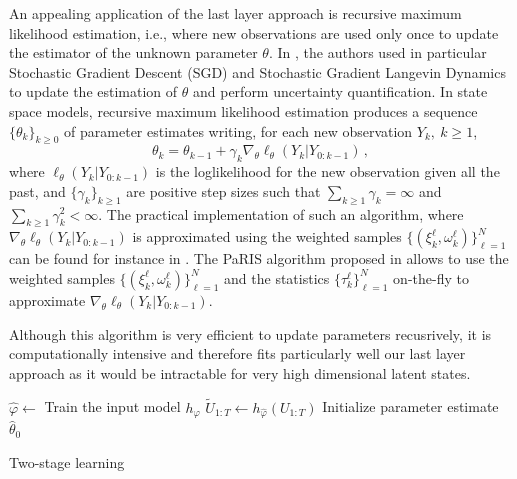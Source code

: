 \documentclass[conference]{IEEEtran}
\begin{document}
An appealing application of the last layer approach is recursive maximum likelihood estimation, i.e., where new observations are used only once to update the estimator of the unknown parameter $\theta$. In \cite{Brosse2020OnLA}, the authors used in particular Stochastic Gradient Descent (SGD) and Stochastic Gradient Langevin Dynamics to update the estimation of $\theta$ and perform uncertainty quantification. In state space models, recursive maximum likelihood estimation produces a sequence $\lbrace\theta_k\rbrace_{k\geq 0}$ of parameter estimates writing, for each new observation $Y_{k},~k\geq 1$,
$$
	\theta_{k} = \theta_{k-1} + \gamma_k \nabla_\theta \ell_{\theta}(Y_k | Y_{0:k - 1}) \,,
$$
where $\ell_{\theta}(Y_k | Y_{0:k - 1})$ is the loglikelihood for the new observation given all the past, and $\lbrace\gamma_k\rbrace_{k\geq 1}$ are positive step sizes such that $\sum_{k \geq 1}\gamma_k = \infty$ and $\sum_{k \geq 1}\gamma_k^2 < \infty$. The practical implementation of such an algorithm, where $\nabla_\theta\ell_{\theta}(Y_k | Y_{0:k - 1})$ is approximated using the weighted samples $\{(\xi^{\ell}_k,\omega^{\ell}_k)\}_{\ell=1}^N$ can be found for instance in \cite{gloaguen2022pseudo}. The PaRIS algorithm proposed in \cite{Olsson2014EfficientPO} allows to use the weighted samples $\{(\xi^{\ell}_k,\omega^{\ell}_k)\}_{\ell=1}^N$ and the statistics $\{\tau^{\ell}_k\}_{\ell=1}^N$ on-the-fly to approximate $\nabla_\theta \ell_{\theta}(Y_k | Y_{0:k - 1})$.

Although this algorithm is very efficient to update parameters recusrively, it is computationally intensive and therefore fits particularly well our last layer approach as it would be intractable for very high dimensional latent states.

\begin{algorithm}
	\label{alg:particle_filter}
	$\hat \varphi \gets$ Train the input model $h_\varphi$\;
	$\widetilde U_{1:T} \gets h_{\hat \varphi}(U_{1:T})$\;
	Initialize parameter estimate $\widehat \theta_0$\;
	\caption{Two-stage learning}
\end{algorithm}
\end{document}
